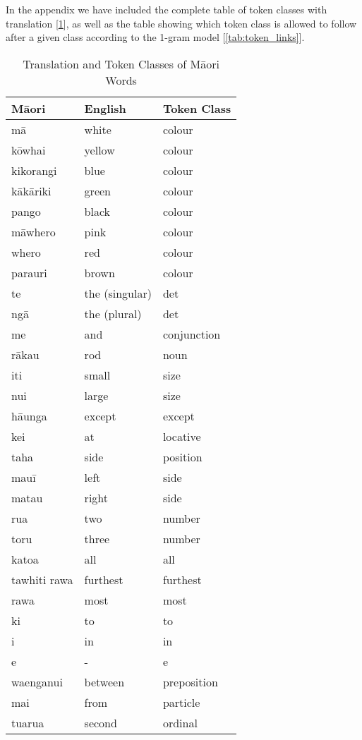 In the appendix we have included the complete table of token classes with translation [\ref{tab:maori_words}], as well as the table showing which token class is allowed to follow after a given class according to the 1-gram model [\ref{tab:token_links}].

\begin{table}[h]
  \centering
  \begin{tabular}{|l|l|l|}
    \hline
    \textbf{Māori} & \textbf{English} & \textbf{Token Class} \\ \hline
    mā & white & colour \\ \hline
    kōwhai & yellow & colour \\ \hline
    kikorangi & blue & colour \\ \hline
    kākāriki & green & colour \\ \hline
    pango & black & colour \\ \hline
    māwhero & pink & colour \\ \hline
    whero & red & colour \\ \hline
    parauri & brown & colour \\ \hline
    te & the (singular) & det \\ \hline
    ngā & the (plural) & det \\ \hline
    me & and & conjunction \\ \hline
    rākau & rod & noun \\ \hline
    iti & small & size \\ \hline
    nui & large & size \\ \hline
    hāunga & except & except \\ \hline
    kei & at & locative \\ \hline
    taha & side & position \\ \hline
    mauī & left & side \\ \hline
    matau & right & side \\ \hline
    rua & two & number \\ \hline
    toru & three & number \\ \hline
    katoa & all & all \\ \hline
    tawhiti rawa & furthest & furthest \\ \hline
    rawa & most & most \\ \hline
    ki & to & to \\ \hline
    i & in & in \\ \hline
    e & - & e \\ \hline
    waenganui & between & preposition \\ \hline
    mai & from & particle \\ \hline
    tuarua & second & ordinal \\ \hline
  \end{tabular}
  \caption{Translation and Token Classes of Māori Words}
  \label{tab:maori_words}
\end{table}



